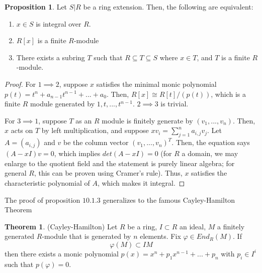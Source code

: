 \documentclass{article}
\theoremstyle{definition}
\newtheorem{theorem}{Theorem}[section]
\theoremstyle{definition}
\theoremstyle{definition}
\newtheorem{proposition}{Proposition}[section]
\theoremstyle{definition}
\theoremstyle{definition}
\theoremstyle{definition}
\theoremstyle{definition}
\begin{document}
\begin{tcolorbox}[colback=blue!5!white,colframe=blue!30!white]
\begin{proposition}
Let $S|R$ be a ring extension. Then, the following are equivalent:
\begin{enumerate}
    \item $x\in S$ is integral over $R$.
    \item $R[x]$ is a finite $R$-module
    \item There exists a subring $T$ such that $R\subseteq T\subseteq S$ where $x\in T$, and $T$ is a finite $R$-module. 
\end{enumerate}
\end{proposition}
\end{tcolorbox}
\begin{proof}
    For $1\implies 2$, suppose $x$ satisfies the minimal monic polynomial $p(t)=t^n+a_{n-1}t^{n-1}+...+a_0$. Then, $R[x]\cong R[t]/(p(t))$, which is a finite $R$ module generated by $1,t,...,t ^{n-1}$. 
    $2\implies 3$ is trivial. 
    
    
    For $3\implies 1$, suppose $T$ as an $R$ module is finitely generate by $(v_1,...,v_n)$. Then, $x$ acts on $T$ by left multiplication, and suppose $xv_i=\sum_{j=1}^{n}a_{i,j}v_j$. Let $A=(a_{i,j})$ and $v$ be the column vector $(v_1,...,v_n)^T$. Then, the equation says $(A-xI)v=0$, which implies $det(A-xI)=0$ (for $R$ a domain, we may enlarge to the quotient field and the statement is purely linear algebra; for general $R$, this can be proven using Cramer's rule). Thus, $x$ satisfies the characteristic polynomial of $A$, which makes it integral. 
\end{proof}
The proof of proposition $10.1.3$ generalizes to the famous Cayley-Hamilton Theorem

\begin{tcolorbox}[colback=red!5!white,colframe=red!30!white]
\begin{theorem}
(Cayley-Hamilton) Let $R$ be a ring, $I\subset R$ an ideal, $M$ a finitely generated $R$-module that is generated by $n$ elements. Fix $\varphi\in End_R(M)$. If 
\[\varphi(M)\subset IM\]
then there exists a monic polynomial $p(x)=x^n+p_1x^{n-1}+...+p_n$ with $p_i\in I^i$ such that $p(\varphi)=0$.
\end{theorem}
\end{tcolorbox}
\end{document}
